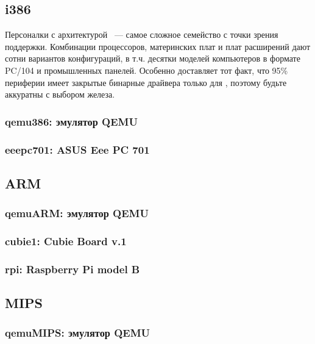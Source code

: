 
\subsection{i386}

Персоналки с архитектурой \ --- самое сложное семейство с точки
зрения поддержки. Комбинации процессоров, материнских плат и плат расширений
дают сотни вариантов конфигураций, в т.ч. десятки моделей компьютеров в формате
PC/104 и промышленных панелей. Особенно доставляет тот факт, что 95\% периферии
имеет закрытые бинарные драйвера только для \win, поэтому будьте аккуратны с
выбором железа.

\subsubsection{qemu386: эмулятор QEMU}


\subsubsection{eeepc701: ASUS Eee PC 701}


\subsection{ARM}

\subsubsection{qemuARM: эмулятор QEMU}
\subsubsection{cubie1: Cubie Board v.1}
\subsubsection{rpi: Raspberry Pi model B}
\subsection{MIPS}
\subsubsection{qemuMIPS: эмулятор QEMU}
